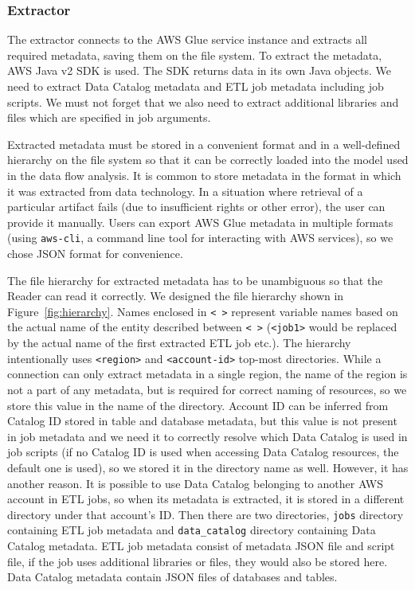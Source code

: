\subsubsection{Extractor}
The extractor connects to the AWS Glue service instance and extracts all required metadata, saving them on the file system. To extract the metadata, AWS Java v2 SDK is used. The SDK returns data in its own Java objects. We need to extract Data Catalog metadata and ETL job metadata including job scripts. We must not forget that we also need to extract additional libraries and files which are specified in job arguments.
\par
Extracted metadata must be stored in a convenient format and in a well-defined hierarchy on the file system so that it can be correctly loaded into the model used in the data flow analysis. It is common to store metadata in the format in which it was extracted from data technology. In a situation where retrieval of a particular artifact fails (due to insufficient rights or other error), the user can provide it manually. Users can export AWS Glue metadata in multiple formats (using \texttt{aws-cli}, a command line tool for interacting with AWS services), so we chose JSON format for convenience.
\par
The file hierarchy for extracted metadata has to be unambiguous so that the Reader can read it correctly. We designed the file hierarchy shown in Figure~\ref{fig:hierarchy}. Names enclosed in \texttt{< >} represent variable names based on the actual name of the entity described between \texttt{< >} (\texttt{<job1>} would be replaced by the actual name of the first extracted ETL job etc.). The hierarchy intentionally uses \texttt{<region>} and \texttt{<account-id>} top-most directories. While a connection can only extract metadata in a single region, the name of the region is not a part of any metadata, but is required for correct naming of resources, so we store this value in the name of the directory. Account ID can be inferred from Catalog ID stored in table and database metadata, but this value is not present in job metadata and we need it to correctly resolve which Data Catalog is used in job scripts (if no Catalog ID is used when accessing Data Catalog resources, the default one is used), so we stored it in the directory name as well. However, it has another reason. It is possible to use Data Catalog belonging to another AWS account in ETL jobs, so when its metadata is extracted, it is stored in a different directory under that account's ID. Then there are two directories, \texttt{jobs} directory containing ETL job metadata and \texttt{data\_catalog} directory containing Data Catalog metadata. ETL job metadata consist of metadata JSON file and script file, if the job uses additional libraries or files, they would also be stored here. Data Catalog metadata contain JSON files of databases and tables.

